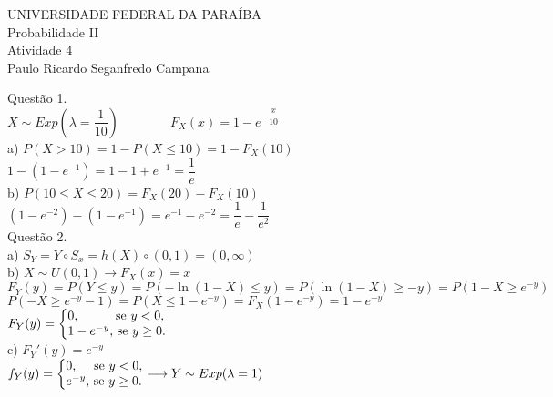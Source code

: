 \documentclass[12pt]{article}
\begin{document}
\begin{center}
	UNIVERSIDADE FEDERAL DA PARAÍBA\\
	Probabilidade II\\
	Atividade 4\\
	Paulo Ricardo Seganfredo Campana
\end{center}

\noindent Questão 1.\\

$X\sim Exp\left(\lambda = \dfrac{1}{10}\right)\qquad\qquad F_{X}(x)=1-e^{-\dfrac{x}{10}}$\\

\noindent a) $P(X>10)=1-P(X\leq10)=1-F_{X}(10)$\\

$1-(1-e^{-1})=1-1+e^{-1}=\dfrac{1}{e}$\\

\noindent b) $P(10\leq X\leq20)=F_{X}(20)-F_{X}(10)$\\

$(1-e^{-2})-(1-e^{-1})=e^{-1}-e^{-2}=\dfrac{1}{e}-\dfrac{1}{e^{2}}$\\

\noindent Questão 2.\\

\noindent a) $S_{Y}=Y\circ S_{x}=h(X)\circ(0,1)=(0,\infty)$\\

\noindent b) $X\sim U(0,1)\longrightarrow F_{X}(x)=x$\\

$F_{Y}(y)=P(Y\leq y)=P(-\ln(1-X)\leq y)=P(\ln(1-X)\geq -y)=P(1-X\geq e^{-y})$\\

$P(-X\geq e^{-y}-1)=P(X\leq1-e^{-y})=F_{X}(1-e^{-y})=1-e^{-y}$\\

$F_{Y}(y)=\left\{\begin{array}{@{}l@{}}0\text{,\qquad\quad se }y<0,\\1-e^{-y}\text{, se }y\geq0.\end{array}\right.$\\

\noindent c) $F_{Y}'(y)=e^{-y}$\\

$f_{Y}(y)=\left\{\begin{array}{@{}l@{}}0\text{,\hspace{+11pt} se }y<0,\\e^{-y}\text{, se }y\geq0.\end{array}\right.\longrightarrow Y\sim Exp(\lambda = 1)$\\
\end{document}
